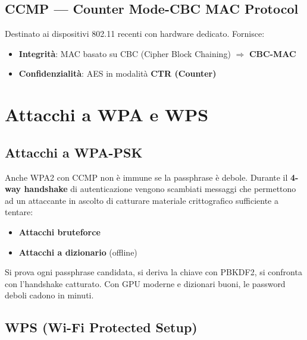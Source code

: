 \subsection{CCMP --- Counter Mode-CBC MAC Protocol}

Destinato ai dispositivi 802.11 recenti con hardware dedicato. Fornisce:
\begin{itemize}
  \item \textbf{Integrit\`a}: MAC basato su CBC (Cipher Block Chaining) $\Rightarrow$ \textbf{CBC-MAC}
  \item \textbf{Confidenzialit\`a}: AES in modalit\`a \textbf{CTR (Counter)}
\end{itemize}


\section{Attacchi a WPA e WPS}

\subsection{Attacchi a WPA-PSK}

Anche WPA2 con CCMP non \`e immune se la passphrase \`e debole. Durante il \textbf{4-way handshake} di autenticazione vengono scambiati messaggi che permettono ad un attaccante in ascolto di catturare materiale crittografico sufficiente a tentare:
\begin{itemize}
  \item \textbf{Attacchi bruteforce}
  \item \textbf{Attacchi a dizionario} (offline)
\end{itemize}

Si prova ogni passphrase candidata, si deriva la chiave con PBKDF2, si confronta con l'handshake catturato. Con GPU moderne e dizionari buoni, le password deboli cadono in minuti.

\subsection{WPS (Wi-Fi Protected Setup)}

